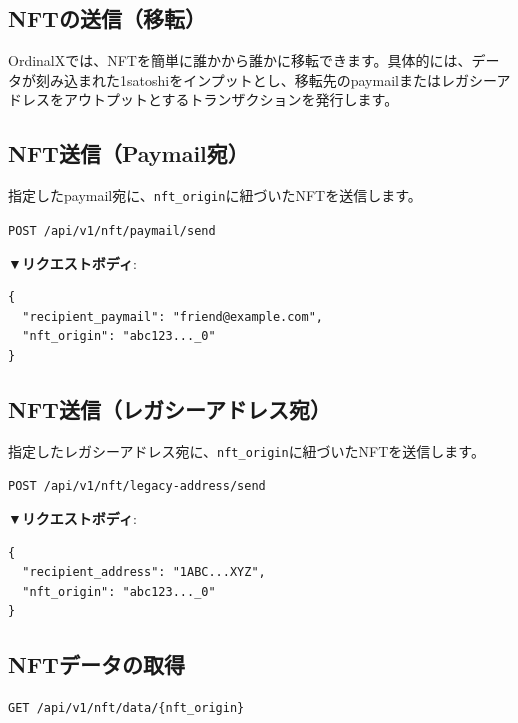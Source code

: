 \documentclass[11pt,a4paper]{ltjsarticle}  %
\begin{document}
\subsection{NFTの送信（移転）}

OrdinalXでは、NFTを簡単に誰かから誰かに移転できます。具体的には、データが刻み込まれた1satoshiをインプットとし、移転先のpaymailまたはレガシーアドレスをアウトプットとするトランザクションを発行します。

\subsection{NFT送信（Paymail宛）}
指定したpaymail宛に、\verb|nft_origin|に紐づいたNFTを送信します。
\begin{tcolorbox}[colback=blue!5,colframe=blue!50!black,title=エンドポイント]
\texttt{POST /api/v1/nft/paymail/send}
\end{tcolorbox}




\textbf{▼リクエストボディ}:
\begin{lstlisting}[style=json]
{
  "recipient_paymail": "friend@example.com",
  "nft_origin": "abc123..._0"
}
\end{lstlisting}

\subsection{NFT送信（レガシーアドレス宛）}

指定したレガシーアドレス宛に、\verb|nft_origin|に紐づいたNFTを送信します。

\begin{tcolorbox}[colback=blue!5,colframe=blue!50!black,title=エンドポイント]
\texttt{POST /api/v1/nft/legacy-address/send}
\end{tcolorbox}

\textbf{▼リクエストボディ}:
\begin{lstlisting}[style=json]
{
  "recipient_address": "1ABC...XYZ",
  "nft_origin": "abc123..._0"
}
\end{lstlisting}

\subsection{NFTデータの取得}

\begin{tcolorbox}[colback=blue!5,colframe=blue!50!black,title=エンドポイント]
\texttt{GET /api/v1/nft/data/\{nft\_origin\}}
\end{tcolorbox}
\end{document}
